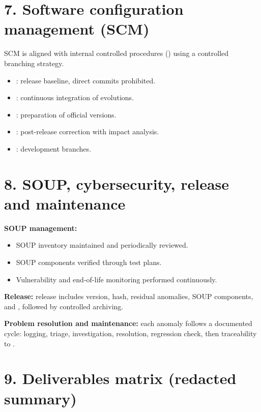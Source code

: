 \section*{7. Software configuration management (SCM)}

SCM is aligned with internal controlled procedures (\caviarder[2.2cm]) using a controlled branching strategy.

\begin{itemize}
  \item \caviarder[2.6cm]: release baseline, direct commits prohibited.
  \item \caviarder[2.6cm]: continuous integration of evolutions.
  \item \caviarder[2.6cm]: preparation of official versions.
  \item \caviarder[2.6cm]: post-release correction with impact analysis.
  \item \caviarder[3.8cm]: development branches.
\end{itemize}

\section*{8. SOUP, cybersecurity, release and maintenance}

\textbf{SOUP management:}
\begin{itemize}
  \item SOUP inventory maintained and periodically reviewed.
  \item SOUP components verified through test plans.
  \item Vulnerability and end-of-life monitoring performed continuously.
\end{itemize}

\textbf{Release:}
release includes version, hash, residual anomalies, SOUP components, and \caviarder[3.8cm], followed by controlled archiving.

\textbf{Problem resolution and maintenance:}
each anomaly follows a documented cycle: logging, triage, investigation, resolution, regression check, then traceability to \caviarder[3.2cm].

\section*{9. Deliverables matrix (redacted summary)}

